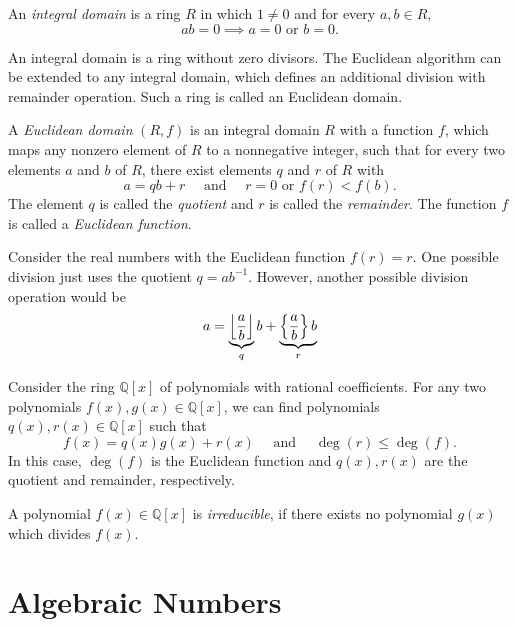 \begin{definition}
  An \emph{integral domain} is a ring $R$ in which $1 ≠ 0$ and for every $a, b ∈ R$,
  \[
    ab = 0 \implies a = 0 \text{ or } b = 0.
  \]
\end{definition}

An integral domain is a ring without zero divisors.
The Euclidean algorithm can be extended to any integral domain,
which defines an additional division with remainder operation.
Such a ring is called an Euclidean domain.

\begin{definition}
  A \emph{Euclidean domain} $(R, f)$ is an integral domain $R$ with a function $f$,
  which maps any nonzero element of $R$ to a nonnegative integer,
  such that for every two elements $a$ and $b$ of $R$, there exist elements $q$ and $r$ of $R$ with
  \[
    a = qb + r \quad \text{ and } \quad r = 0 \text{ or } f(r) < f(b).
  \]
  The element $q$ is called the \emph{quotient} and $r$ is called the \emph{remainder}.
  The function $f$ is called a \emph{Euclidean function}.
\end{definition}

\begin{example}
  Consider the real numbers with the Euclidean function $f(r) = r$.
  One possible division just uses the quotient $q = ab^{-1}$.
  However,
  another possible division operation would be
  \[
    a = \underbrace{\left\lfloor\frac{a}{b}\right\rfloor}_q b + \underbrace{\left\{ \frac{a}{b} \right\} b}_r
  \]
\end{example}

\begin{example}
  Consider the ring $ℚ[x]$ of polynomials with rational coefficients.
  For any two polynomials $f(x), g(x) ∈ ℚ[x]$,
  we can find polynomials $q(x), r(x) ∈ ℚ[x]$ such that
  \[
    f(x) = q(x) g(x) + r(x)
    \quad
    \text{ and }
    \quad
    \deg(r) ≤ \deg(f).
  \]
  In this case, $\deg(f)$ is the Euclidean function and $q(x), r(x)$ are
  the quotient and remainder, respectively.
\end{example}

\begin{definition}
  A polynomial $f(x) ∈ ℚ[x]$ is \emph{irreducible},
  if there exists no polynomial $g(x)$ which divides $f(x)$.
\end{definition}

\section{Algebraic Numbers}

